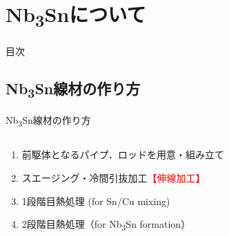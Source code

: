 \documentclass[aspectratio=169, unicode, 10pt]{beamer}
\begin{document}
	\section{Nb\textsubscript{3}Snについて}
	\begin{frame}{目次}
	\end{frame}

	\subsection{Nb\textsubscript{3}Sn線材の作り方}
	\begin{frame}{Nb\textsubscript{3}Sn線材の作り方}
		\begin{columns}
			\begin{column}{0.65\linewidth}
				\begin{enumerate}
					\item 前駆体となるパイプ．ロッドを用意・組み立て
					\item スエージング・冷間引抜加工\textcolor{red}{【伸線加工】}
					\item 1段階目熱処理 (for Sn/Cu mixing)
					\item 2段階目熱処理（for Nb\textsubscript{3}Sn formation）
				\end{enumerate}
			\end{column}
			\begin{column}{0.35\linewidth}
				\begin{figure}
					\centering

\end{figure}
\end{column}
\end{columns}
\end{frame}
\end{document}
